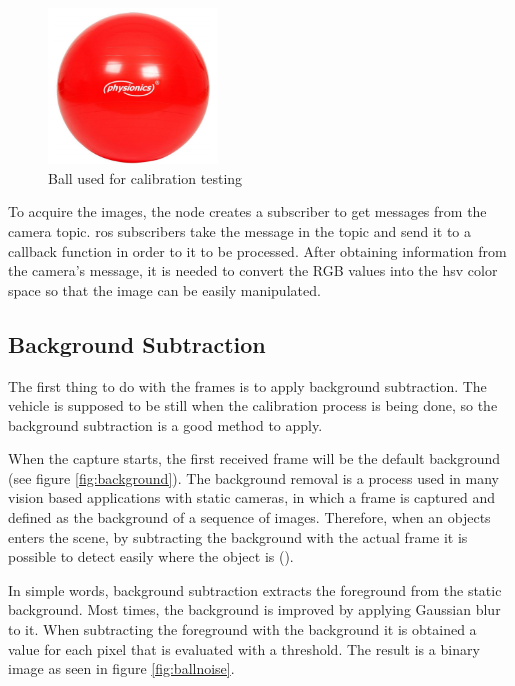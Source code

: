 \begin{figure}[htp]
	
	\centering
	\includegraphics[width=0.4\textwidth]{capcalib/imgs/ball.png}
	
	\caption{Ball used for calibration testing}
	\label{fig:ball}
	
\end{figure}

To acquire the images, the node creates a subscriber to get messages from the camera topic. \gls{ros} subscribers take the message in the topic and send it to a callback function in order to it to be processed. After obtaining information from the camera's message, it is needed to convert the RGB values into the \gls{hsv} color space so that the image can be easily manipulated.

\subsection{Background Subtraction}

The first thing to do with the frames is to apply background subtraction. The vehicle is supposed to be still when the calibration process is being done, so the background subtraction is a good method to apply.

When the capture starts, the first received frame will be the default background (see figure \ref{fig:background}). The background removal is a process used in many vision based applications with static cameras, in which a frame is captured and defined as the background of a sequence of images. Therefore, when an objects enters the scene, by subtracting the background with the actual frame it is possible to detect easily where the object is (\cite{OpenCV}).

In simple words, background subtraction extracts the foreground from the static background. Most times, the background is improved by applying Gaussian blur to it. When subtracting the foreground with the background it is obtained a value for each pixel that is evaluated with a threshold. The result is a binary image as seen in figure \ref{fig:ballnoise}.

